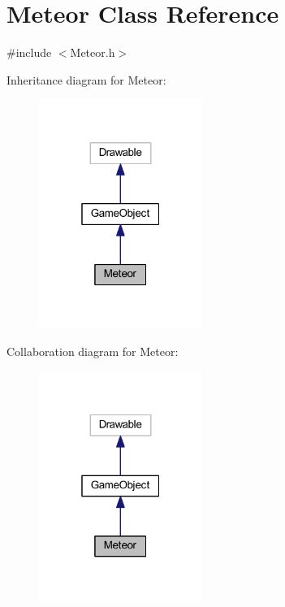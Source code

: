 \hypertarget{class_meteor}{}\section{Meteor Class Reference}
\label{class_meteor}


{\ttfamily \#include $<$Meteor.\+h$>$}



Inheritance diagram for Meteor\+:\nopagebreak
\begin{figure}[H]
\begin{center}
\leavevmode
\includegraphics[width=151pt]{class_meteor__inherit__graph}
\end{center}
\end{figure}


Collaboration diagram for Meteor\+:\nopagebreak
\begin{figure}[H]
\begin{center}
\leavevmode
\includegraphics[width=151pt]{class_meteor__coll__graph}
\end{center}
\end{figure}
